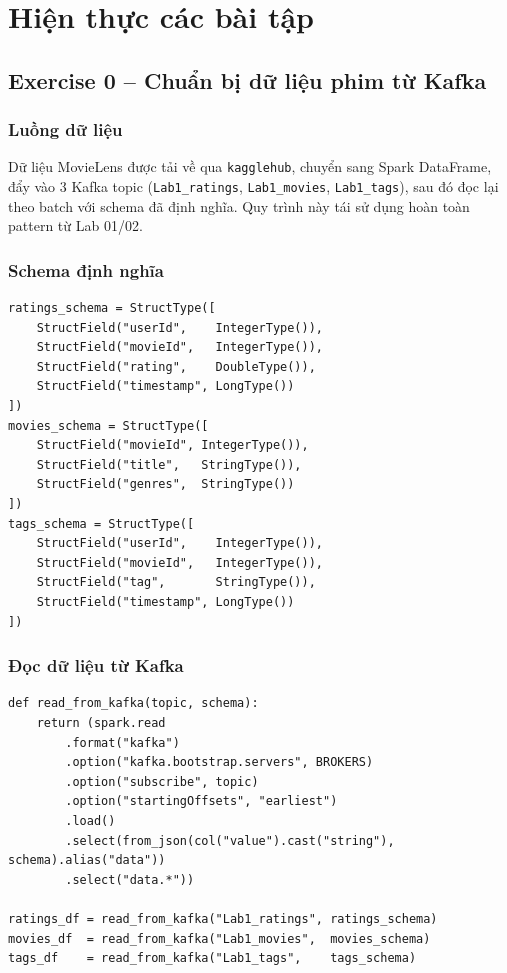 \section{Hiện thực các bài tập}

\subsection{Exercise 0 -- Chuẩn bị dữ liệu phim từ Kafka}

\subsubsection{Luồng dữ liệu}

Dữ liệu MovieLens được tải về qua \texttt{kagglehub}, chuyển sang Spark DataFrame, đẩy vào 3 Kafka topic (\texttt{Lab1\_ratings}, \texttt{Lab1\_movies}, \texttt{Lab1\_tags}), sau đó đọc lại theo batch với schema đã định nghĩa. Quy trình này tái sử dụng hoàn toàn pattern từ Lab 01/02.

\subsubsection{Schema định nghĩa}

\begin{lstlisting}[style=PythonStyle, caption={Định nghĩa schema cho 3 topic Kafka}]
ratings_schema = StructType([
    StructField("userId",    IntegerType()),
    StructField("movieId",   IntegerType()),
    StructField("rating",    DoubleType()),
    StructField("timestamp", LongType())
])
movies_schema = StructType([
    StructField("movieId", IntegerType()),
    StructField("title",   StringType()),
    StructField("genres",  StringType())
])
tags_schema = StructType([
    StructField("userId",    IntegerType()),
    StructField("movieId",   IntegerType()),
    StructField("tag",       StringType()),
    StructField("timestamp", LongType())
])
\end{lstlisting}

\subsubsection{Đọc dữ liệu từ Kafka}

\begin{lstlisting}[style=PythonStyle, caption={Hàm đọc batch từ Kafka và parse JSON}]
def read_from_kafka(topic, schema):
    return (spark.read
        .format("kafka")
        .option("kafka.bootstrap.servers", BROKERS)
        .option("subscribe", topic)
        .option("startingOffsets", "earliest")
        .load()
        .select(from_json(col("value").cast("string"), schema).alias("data"))
        .select("data.*"))

ratings_df = read_from_kafka("Lab1_ratings", ratings_schema)
movies_df  = read_from_kafka("Lab1_movies",  movies_schema)
tags_df    = read_from_kafka("Lab1_tags",    tags_schema)
\end{lstlisting}


